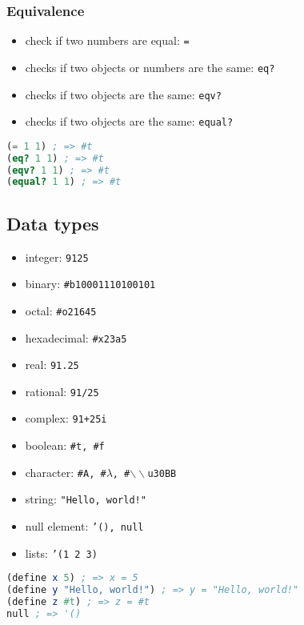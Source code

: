 \documentclass[a4paper,landscape,10pt]{article}
\begin{document}
\begin{multicols*}{2}
  \subsubsection{Equivalence}

  \begin{itemize}
    \item check if two numbers are equal: \texttt{=}
    \item checks if two objects or numbers are the same: \texttt{eq?}
    \item checks if two objects are the same: \texttt{eqv?}
    \item checks if two objects are the same: \texttt{equal?}
  \end{itemize}

  \begin{lstlisting}[language=Scheme]
(= 1 1) ; => #t
(eq? 1 1) ; => #t
(eqv? 1 1) ; => #t
(equal? 1 1) ; => #t
\end{lstlisting}

  \subsection{Data types}

  \begin{itemize}
    \item integer: \texttt{9125}
    \item binary: \texttt{\#b10001110100101}
    \item octal: \texttt{\#o21645}
    \item hexadecimal: \texttt{\#x23a5}
    \item real: \texttt{91.25}
    \item rational: \texttt{91/25}
    \item complex: \texttt{91+25i}
    \item boolean: \texttt{\#t, \#f}
    \item character: \texttt{\#A, \#\(\lambda\), \#\(\backslash\backslash\)u30BB}
    \item string: \texttt{"Hello, world!"}
    \item null element: \texttt{'(), null}
    \item lists: \texttt{'(1 2 3)}
  \end{itemize}

  \begin{lstlisting}[language=Scheme]
(define x 5) ; => x = 5
(define y "Hello, world!") ; => y = "Hello, world!"
(define z #t) ; => z = #t
null ; => '()
\end{lstlisting}


\end{multicols*}
\end{document}
